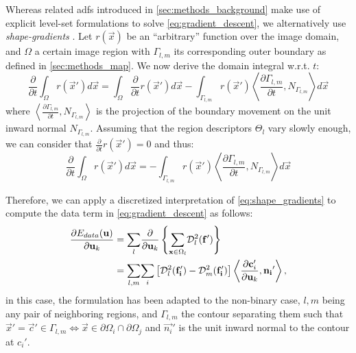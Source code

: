 Whereas related \glspl*{adf} introduced in \autoref{sec:methods_background}
make use of explicit level-set formulations to solve \eqref{eq:gradient_descent},
we alternatively use \emph{shape-gradients}
\cite{jehan-besson_dream2s:_2003,herbulot_segmentation_2006}.
Let $r(\vec{x})$ be an ``arbitrary'' function over the image domain,
and $\Omega$ a certain image region with $\Gamma_{l,m}$ its corresponding
outer boundary as defined in \autoref{sec:methods_map}.
We now derive the domain integral w.r.t. $t$:
\begin{equation*}
\frac{\partial}{\partial t} \int_\Omega r(\vec{x}') d\vec{x} = \int_\Omega \frac{\partial}{\partial t}r(\vec{x}') d\vec{x} - \int_{\Gamma_{l,m}} r(\vec{x}') \left\langle \frac{\partial \Gamma_{l,m} }{\partial t}, N_{\Gamma_{l,m}}\right\rangle d\vec{x}
\end{equation*}
where $\left\langle\frac{\partial\Gamma_{l,m}}{\partial t}, N_{\Gamma_{l,m}}\right\rangle$ is 
the projection of the boundary movement on the unit inward normal $N_{\Gamma_{l,m}}$. Assuming
that the region descriptors $\Theta_l$ vary slowly enough, we can consider
that $\frac{\partial}{\partial t} r(\vec{x}') = 0$ and thus:
\begin{equation}
\frac{\partial}{\partial t} \int_\Omega r(\vec{x}') d\vec{x} = 
- \int_{\Gamma_{l,m}} r(\vec{x}') \left\langle \frac{\partial \Gamma_{l,m} }{\partial t}, N_{\Gamma_{l,m}}\right\rangle d\vec{x}
\label{eq:shape_gradients}
\end{equation}

Therefore, we can apply a discretized interpretation of \eqref{eq:shape_gradients}
to compute the data term in \eqref{eq:gradient_descent} as follows:
\begin{align}
\frac{\partial E_{data}(\vec{u})}{\partial \vec{u}_k} &=
\underset{l}{\sum} \frac{ \partial }{\partial \vec{u}_k} \left\{
 \underset{\vec{x} \in \Omega_l}{\sum} \mdist{f'}{l} \right\} \notag\\
&= \underset{l,m}{\sum} \underset{i}{\sum}
\left[ \mdist{f_i'}{l} - \mdist{f_i'}{m} \right]
\left\langle \frac{\partial \vec{c}_i'}{\partial \vec{u}_k}, \vec{n_i}'\right\rangle,
\label{eq:gradient_wshape}
\end{align}
in this case, the formulation has been adapted to the non-binary case, $l,m$
being any pair of neighboring regions, and $\Gamma_{l,m}$ the contour separating
them such that $\vec{x}' = \vec{c}' \in\Gamma_{l,m} \iff \vec{x}\in \partial\Omega_i \cap \partial\Omega_j$
and $\vec{n_i}'$ is the unit inward normal to the contour at $c_i'$.


